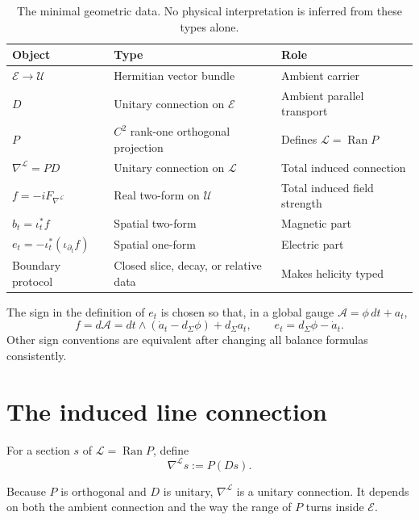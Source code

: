 \documentclass[11pt]{article}
\newcommand{\cE}{\mathcal E}
\newcommand{\cL}{\mathcal L}
\newcommand{\cU}{\mathcal U}
\begin{document}
\begin{table}[ht]
\centering
\small
\begin{tabular}{>{\raggedright\arraybackslash}p{}
                >{\raggedright\arraybackslash}p{}
                >{\raggedright\arraybackslash}p{}}
\toprule
Object & Type & Role \\
\midrule
\(\cE\to\cU\) & Hermitian vector bundle & Ambient carrier \\
\(D\) & Unitary connection on \(\cE\) & Ambient parallel transport \\
\(P\) & \(C^2\) rank-one orthogonal projection & Defines
\(\cL=\operatorname{Ran}P\) \\
\(\nabla^\cL=P D\) & Unitary connection on \(\cL\) & Total induced connection \\
\(f=-iF_{\nabla^\cL}\) & Real two-form on \(\cU\) & Total induced field strength \\
\(b_t=\iota_t^*f\) & Spatial two-form & Magnetic part \\
\(e_t=-\iota_t^*(\iota_{\partial_t}f)\) & Spatial one-form & Electric part \\
Boundary protocol & Closed slice, decay, or relative data & Makes helicity typed \\
\bottomrule
\end{tabular}
\caption{The minimal geometric data.  No physical interpretation is inferred
from these types alone.}
\label{tab:contract}
\end{table}

The sign in the definition of \(e_t\) is chosen so that, in a global gauge
\(\mathcal A=\phi\,dt+a_t\),
\[
f=d\mathcal A
  =dt\wedge(\dot a_t-d_\Sigma\phi)+d_\Sigma a_t,
\qquad
e_t=d_\Sigma\phi-\dot a_t.
\]
Other sign conventions are equivalent after changing all balance formulas
consistently.

\section{The induced line connection}

\begin{definition}\label{def:projected-connection}
For a section \(s\) of \(\cL=\operatorname{Ran}P\), define
\[
\nabla^\cL s:=P(Ds).
\]
\end{definition}

Because \(P\) is orthogonal and \(D\) is unitary,
\(\nabla^\cL\) is a unitary connection.  It depends on both the ambient
connection and the way the range of \(P\) turns inside \(\cE\).
\end{document}
